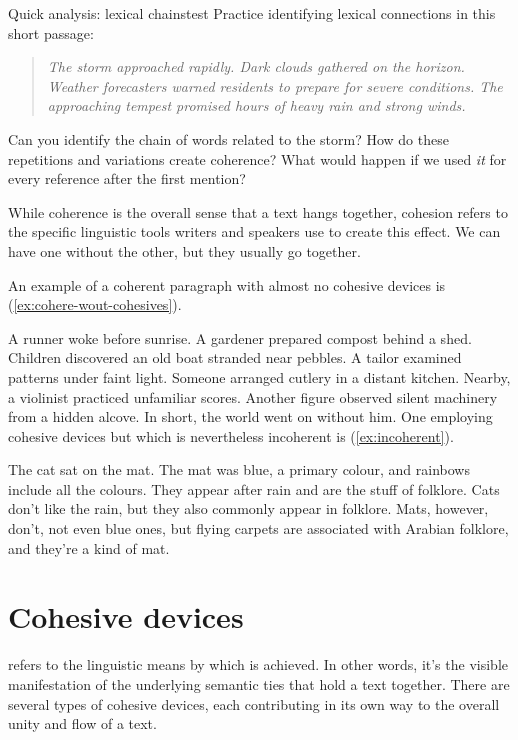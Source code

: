 \begin{tblsframedsymbol}{Quick analysis: lexical chains}{test}
Practice identifying lexical connections in this short passage:
\begin{quote}
\emph{The storm approached rapidly. Dark clouds gathered on the horizon. Weather forecasters warned residents to prepare for severe conditions. The approaching tempest promised hours of heavy rain and strong winds.}
\end{quote}
Can you identify the chain of words related to the storm? How do these repetitions and variations create coherence? What would happen if we used \emph{it} for every reference after the first mention?
\end{tblsframedsymbol}

While coherence is the overall sense that a text hangs together, cohesion refers to the specific linguistic tools writers and speakers use to create this effect. We can have one without the other, but they usually go together.

An example of a coherent paragraph with almost no cohesive devices is (\ref{ex:cohere-wout-cohesives}).

\ea \label{ex:cohere-wout-cohesives}
A runner woke before sunrise. A gardener prepared compost behind a shed. Children discovered an old boat stranded near pebbles. A tailor examined patterns under faint light. Someone arranged cutlery in a distant kitchen. Nearby, a violinist practiced unfamiliar scores. Another figure observed silent machinery from a hidden alcove. In short, the world went on without him.
\z
\noindent One employing cohesive devices but which is nevertheless incoherent is (\ref{ex:incoherent}).

\ea \label{ex:incoherent}
The cat sat on the mat. The mat was blue, a primary colour, and rainbows include all the colours. They appear after rain and are the stuff of folklore. Cats don't like the rain, but they also commonly appear in folklore. Mats, however, don't, not even blue ones, but flying carpets are associated with Arabian folklore, and they're a kind of mat.
\z
{}

\section{Cohesive devices}

 refers to the linguistic means by which  is achieved. In other words, it's the visible manifestation of the underlying semantic ties that hold a text together. There are several types of cohesive devices, each contributing in its own way to the overall unity and flow of a text.

